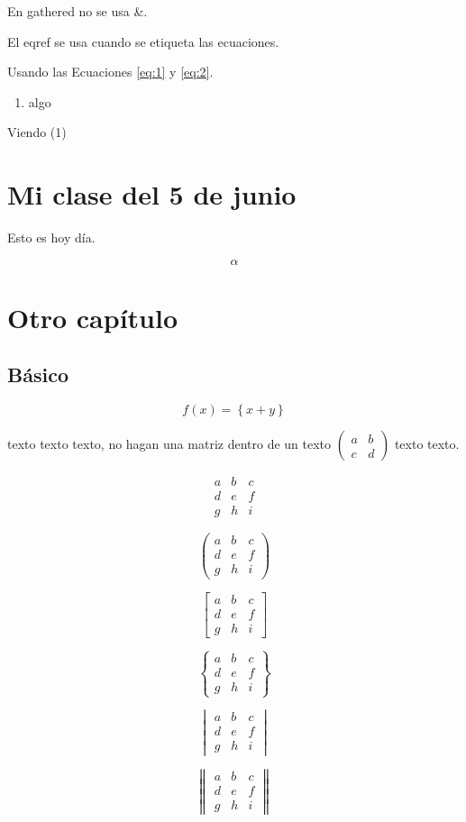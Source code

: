 \documentclass[12pt,a4paper]{report}
\numberwithin{equation}{section}
\begin{document}
En gathered no se usa \&.

El eqref se usa cuando se etiqueta las ecuaciones.

Usando las Ecuaciones \eqref{eq:1} y \eqref{eq:2}.

\begin{enumerate}
\item algo
\end{enumerate}

Viendo (1)%

\chapter{Mi clase del 5 de junio}

Esto es hoy día.

\begin{equation}
\alpha
\end{equation}

\chapter{Otro capítulo}

\section{Básico}

$$
f(x)=\left\{
x+y
\right\}
$$

texto texto texto, no hagan una matriz dentro de un texto $\left(\begin{smallmatrix} a & b\\ c & d \end{smallmatrix}\right)$ texto texto.

$$
\begin{matrix}
a & b & c \\
d & e & f \\
g & h & i
\end{matrix}
$$

$$
\begin{pmatrix}
a & b & c \\
d & e & f \\
g & h & i
\end{pmatrix}
$$

$$
\begin{bmatrix}
a & b & c \\
d & e & f \\
g & h & i
\end{bmatrix}
$$

$$
\begin{Bmatrix}
a & b & c \\
d & e & f \\
g & h & i
\end{Bmatrix}
$$

$$
\begin{vmatrix}
a & b & c \\
d & e & f \\
g & h & i
\end{vmatrix}
$$

$$
\begin{Vmatrix}
a & b & c \\
d & e & f \\
g & h & i
\end{Vmatrix}
$$%
\end{document}
